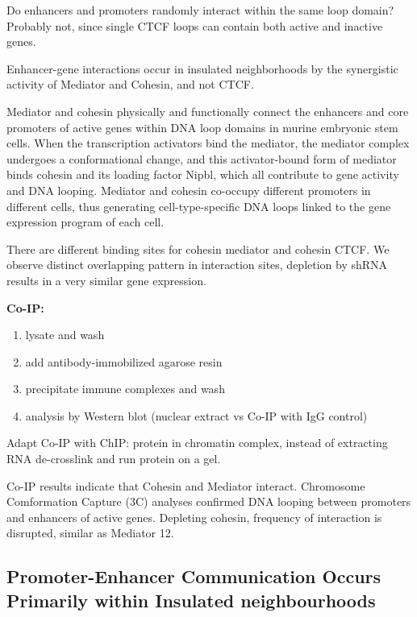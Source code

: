 Do enhancers and promoters randomly interact within the same loop domain? Probably not, since single CTCF loops can contain both active and inactive genes.

Enhancer-gene interactions occur in insulated neighborhoods by the synergistic activity of Mediator and Cohesin, and not CTCF.

Mediator and cohesin physically and functionally connect the enhancers and core promoters of active genes within DNA loop domains in murine embryonic stem cells. When the transcription activators bind the mediator, the mediator complex undergoes a conformational change, and this activator-bound form of mediator binds cohesin and its loading factor Nipbl, which all contribute to gene activity and DNA looping. Mediator and cohesin co-occupy different promoters in different cells, thus generating cell-type-specific DNA loops linked to the gene expression program of each cell.

There are different binding sites for cohesin mediator and cohesin CTCF. We observe distinct overlapping pattern in interaction sites, depletion by shRNA results in a very similar gene expression.

\textbf{Co-IP:}

\begin{enumerate}
\def\labelenumi{\arabic{enumi}.}
\tightlist
\item
  lysate and wash
\item
  add antibody-immobilized agarose resin
\item
  precipitate immune complexes and wash
\item
  analysis by Western blot (nuclear extract vs Co-IP with IgG control)
\end{enumerate}

Adapt Co-IP with ChIP: protein in chromatin complex, instead of extracting RNA de-crosslink and run protein on a gel.

Co-IP results indicate that Cohesin and Mediator interact. Chromosome Comformation Capture (3C) analyses confirmed DNA looping between promoters and enhancers of active genes. Depleting cohesin, frequency of interaction is disrupted, similar as Mediator 12.

\hypertarget{promoter-enhancer-communication-occurs-primarily-within-insulated-neighbourhoods}{%
\subsection{Promoter-Enhancer Communication Occurs Primarily within Insulated neighbourhoods}\label{promoter-enhancer-communication-occurs-primarily-within-insulated-neighbourhoods}}

